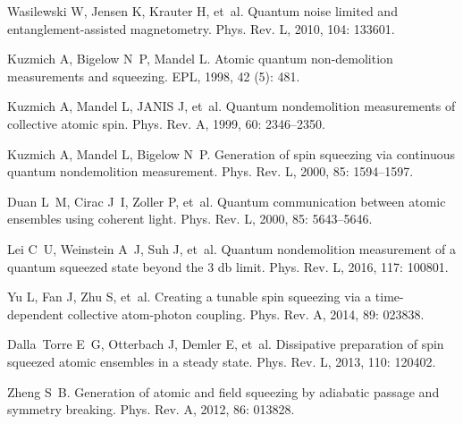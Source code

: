 \begin{thebibliography}{113}
	Wasilewski W, Jensen K, Krauter H, et~al.
	\newblock Quantum noise limited and entanglement-assisted
	magnetometry\allowbreak[J].
	\newblock Phys. Rev. L, 2010, 104: 133601.
	
	Kuzmich A, Bigelow N~P, Mandel L.
	\newblock Atomic quantum non-demolition measurements and
	squeezing\allowbreak[J].
	\newblock EPL, 1998, 42 (5): 481.
	
	Kuzmich A, Mandel L, JANIS J, et~al.
	\newblock Quantum nondemolition measurements of collective atomic
	spin\allowbreak[J].
	\newblock Phys. Rev. A, 1999, 60: 2346--2350.
	
	Kuzmich A, Mandel L, Bigelow N~P.
	\newblock Generation of spin squeezing via continuous quantum nondemolition
	measurement\allowbreak[J].
	\newblock Phys. Rev. L, 2000, 85: 1594--1597.
	
	Duan L~M, Cirac J~I, Zoller P, et~al.
	\newblock Quantum communication between atomic ensembles using coherent
	light\allowbreak[J].
	\newblock Phys. Rev. L, 2000, 85: 5643--5646.
	
	Lei C~U, Weinstein A~J, Suh J, et~al.
	\newblock Quantum nondemolition measurement of a quantum squeezed state beyond
	the 3 db limit\allowbreak[J].
	\newblock Phys. Rev. L, 2016, 117: 100801.
	
	Yu L, Fan J, Zhu S, et~al.
	\newblock Creating a tunable spin squeezing via a time-dependent collective
	atom-photon coupling\allowbreak[J].
	\newblock Phys. Rev. A, 2014, 89: 023838.
	
	Dalla~Torre E~G, Otterbach J, Demler E, et~al.
	\newblock Dissipative preparation of spin squeezed atomic ensembles in a steady
	state\allowbreak[J].
	\newblock Phys. Rev. L, 2013, 110: 120402.
	
	Zheng S~B.
	\newblock Generation of atomic and field squeezing by adiabatic passage and
	symmetry breaking\allowbreak[J].
	\newblock Phys. Rev. A, 2012, 86: 013828.
	

\end{thebibliography}
